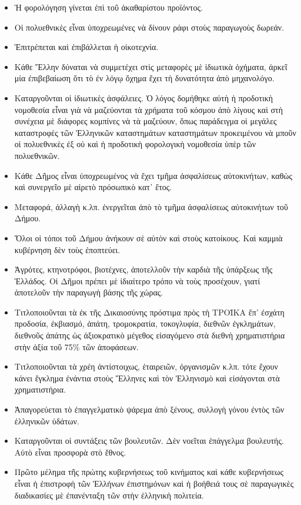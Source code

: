 \documentclass[a4paper]{article}
\begin{document}
\begin{itemize}
\item Ἡ φορολόγηση γίνεται ἐπὶ τοῦ ἀκαθαρίστου προϊόντος.
\item Οἱ πολυεθνικὲς εἶναι ὑποχρεωμένες νὰ δίνουν ράφι στοὺς παραγωγοὺς δωρεάν.
\item Ἐπιτρέπεται καὶ ἐπιβάλλεται ἡ οἰκοτεχνία.
\item Κάθε Ἕλλην δύναται νὰ συμμετέχει στὶς μεταφορὲς μὲ ἰδιωτικὰ ὀχήματα, ἀρκεῖ μία ἐπιβεβαίωση ὅτι τὸ ἐν λόγῳ ὄχημα ἔχει τὴ δυνατότητα ἀπὸ μηχανολόγο.
\item Καταργοῦνται οἱ ἰδιωτικὲς ἀσφάλειες. Ὁ λόγος δομήθηκε αὐτὴ ἡ προδοτικὴ νομοθεσία εἶναι γιὰ νὰ μαζεύονται τὰ χρήματα τοῦ κόσμου ἀπὸ λίγους καὶ στὴ συνέχεια μὲ διάφορες κομπίνες νὰ τὰ μαζεύουν, ὅπως παράδειγμα οἱ μεγάλες καταστροφὲς τῶν Ἑλληνικῶν καταστημάτων καταστημάτων προκειμένου νὰ μποῦν οἱ πολυεθνικὲς ἐξ οὐ καὶ ἡ προδοτικὴ φορολογικὴ νομοθεσία ὑπὲρ τῶν πολυεθνικῶν.
\item Κάθε Δῆμος εἶναι ὑποχρεωμένος νὰ ἔχει τμῆμα ἀσφαλίσεως αὐτοκινήτων, καθὼς καὶ συνεργεῖο μὲ αἱρετὸ πρόσωπικὸ κατ᾿ ἔτος.
\item Μεταφορά, ἀλλαγὴ κ.λπ. ἐνεργεῖται ἀπὸ τὸ τμῆμα ἀσφαλίσεως αὐτοκινήτων τοῦ Δήμου.
\item Ὅλοι οἱ τόποι τοῦ Δήμου ἀνήκουν σὲ αὐτὸν καὶ στοὺς κατοίκους. Καὶ καμμιὰ κυβέρνηση δὲν τοὺς ἐποπτεύει.
\item Ἀγρότες, κτηνοτρόφοι, βιοτέχνες, ἀποτελλοῦν τὴν καρδιὰ τῆς ὑπάρξεως τῆς Ἑλλάδος. Οἱ Δῆμοι πρέπει μὲ ἰδιαίτερο τρόπο νὰ τοὺς προσέχουν, γιατί ἀποτελοῦν τὴν παραγωγὴ βάσης τῆς χώρας.
\item Τιτλοποιοῦνται τὰ ἐκ τῆς Δικαιοσύνης πρόστιμα πρὸς τὴ ΤΡΟΪΚΑ ἔπ' ἐσχάτη προδοσία, ἐκβιασμό, ἀπάτη, τρομοκρατία, τοκογλυφία, διεθνῶν ἐγκλημάτων, διεθνοῦς ἀπάτης ὡς ἀξιοκρατικὸ μέγεθος εἰσαγόμενο στὰ διεθνὴ χρηματιστήρια στὴν ἀξία τοῦ 75\% τῶν ἀποφάσεων.
\item Τιτλοποιοῦνται τὰ χρέη ἀντίστοιχως, ἑταιρειῶν, ὀργανισμῶν κ.λπ. τότε ἔχουν κάνει ἔγκλημα ἐνάντια στοὺς Ἕλληνες καὶ τὸν Ἑλληνισμὸ καὶ εἰσάγονται στὰ χρηματιστήρια.
\item Ἀπαγορεύεται τὸ ἐπαγγελματικὸ ψάρεμα ἀπὸ ξένους, συλλογὴ γόνου ἐντὸς τῶν ἑλληνικῶν ὑδάτων.
\item Καταργοῦνται οἱ συντάξεις τῶν βουλευτῶν. Δὲν νοεῖται ἐπάγγελμα βουλευτής. Αὐτὸ εἶναι προσφορὰ στὸ ἔθνος.
\item Πρῶτο μέλημα τῆς πρώτης κυβερνήσεως τοῦ κινήματος καὶ κάθε κυβερνήσεως εἶναι ἡ ἐπιστροφὴ τῶν Ἑλλήνων ἐπιστημόνων καὶ ἡ βοήθειά τους σὲ παραγωγικὲς διαδικασίες μὲ ἐπανένταξη τῶν στὴν ἑλληνικὴ πολιτεία.

\end{itemize}
\end{document}
